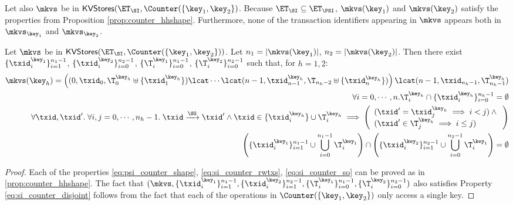 Let also $\mkvs$ be in $\mathsf{KVStores}(\ET_{\SI}, \Counter(\{\key_1, \key_2\})$. Because 
$\ET_{\SI} \subseteq \ET_{\PSI}$, $\mkvs(\key_1)$ and $\mkvs(\key_2)$ satisfy the 
properties from Proposition \ref{prop:counter_hhshape}. 
Furthermore, none of the transaction identifiers appearing in $\mkvs$ appears 
both in $\mkvs_{\key_1}$ and $\mkvs_{\key_2}$.
\begin{proposition}
\label{prop:si_counter_hhshape1}
Let $\mkvs$ be in $\mathsf{KVStores}(\ET_{\SI}, \Counter(\{\key_1, \key_2\}))$. 
Let $n_1 = \lvert \mkvs(\key_1) \rvert$, $n_2 = \lvert \mkvs(\key_2) \rvert$. 
Then there exist $\{\txid_{i}^{\key_1}\}_{i=1}^{n_1 - 1}$, $\{\txid_{i}^{\key_2}\}_{i=0}^{n_2 - 1}$, 
$\{\T_{i}^{\key_1}\}_{i=0}^{n_1-1}$, $\{\T_{i}^{\key_2}\}_{i=0}^{n_2 - 1}$ such that, 
for $h = 1,2$: 
\begin{align}
\mkvs(\key_{h}) = \left( (0, \txid_{0}, \T^{\key_{h}}_{0} \uplus \{\txid^{\key_{h}}_1\}) \lcat \cdots \lcat (n-1, \txid^{\key_{h}}_{n-1}, \T_{n_{h}-2} \uplus \{\txid^{\key_{h}}_{n}\}) \right) 
\lcat (n-1, \txid_{n_{h} - 1}, \T^{\key_{h}}_{n_{h} - 1}) \label{eq:si_counter_shape}\\
\forall i=0,\cdots,n.\T^{\key_{h}}_{i} \cap \{\txid^{\key_{h}}_{i}\}_{i=0}^{n_{h}-1} = \emptyset \label{eq:si_counter_rwtxs}\\
\forall \txid, \txid'.\;\forall i,j=0,\cdots, n_{h} - 1.\; \txid \xrightarrow{\SO} \txid' 
\wedge \txid \in \{\txid^{\key_{h}}_{i}\} \cup \T^{\key_{h}}_{i} \implies 
\left(\begin{array}{l}
(\txid' = \txid^{\key_{h}}_{j} \implies i < j) \wedge {} \\
(\txid' \in \T^{\key_{h}}_{j} \implies i \leq j) \\
\end{array}\right) \label{eq:si_counter_so}\\
\left( \{\txid^{\key_{1}}_{i}\}_{i=1}^{n_1 -1} \cup \bigcup_{i=0}^{n_1 - 1} \T_{i}^{\key_1} \right) \cap 
\left( \{\txid^{\key_{2}}_{i}\}_{i=1}^{n_2 -1} \cup \bigcup_{i=0}^{n_2 - 1} \T_{i}^{\key_1} \right) = \emptyset \label{eq:si_counter_disjoint}
\end{align}

\end{proposition}

\begin{proof}
Each of the properties \eqref{eq:psi_counter_shape}, \eqref{eq:si_counter_rwtxs}, \eqref{eq:si_counter_so} 
can be proved as in \cref{prop:counter_hhshape}. The fact that $(\mkvs, \{\txid_{i}^{\key_{1}}\}_{i=1}^{n_1 - 1}, \{\txid^{\key_2}_{i}\}_{i=1}^{n_2 - 1}, 
\{\T_{i}^{\key_1}\}_{i=0}^{n_1 - 1}, \{\T_{i}^{\key_2}\}_{i=0}^{n_2-1})$ also satisfies Property \eqref{eq:si_counter_disjoint} 
follows from the fact that each of the operations in $\Counter(\{\key_1, \key_2\})$ only access a single key. 
\end{proof}

